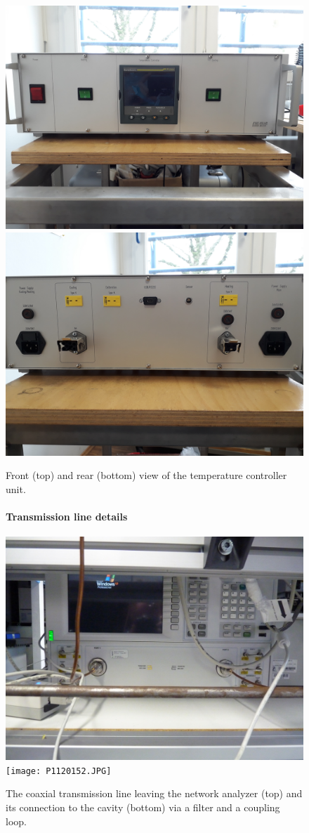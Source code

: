 \documentclass[12pt]{article}
\begin{document}
\clearpage
\begin{figure}[p]
\centering
\includegraphics[width=0.8\linewidth]{6220_front.jpg}
\includegraphics[width=0.8\linewidth]{6220_back.jpg}
\caption{Front (top) and rear (bottom) view of the temperature controller unit. \label{eurothermB}}
\end{figure}

\clearpage
\begin{figure}[p]
\paragraph{Transmission line details\vspace{1em}}
\begin{center}
\includegraphics[width=0.8\linewidth]{P1120150.JPG}
\texttt{[image: P1120152.JPG]}
\caption{The coaxial transmission line leaving the network analyzer (top) and its connection to the cavity (bottom) via a filter and a coupling loop. \label{vna}}
\end{center}
\end{figure}
\end{document}
